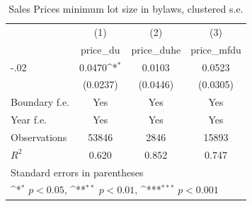 \begin{table}[htbp]\centering
\def\sym#1{\ifmmode^{#1}\else\(^{#1}\)\fi}
\caption{Sales Prices minimum lot size in bylaws, clustered s.e.}
\begin{tabular}{l*{3}{c}}
\hline\hline
                    &\multicolumn{1}{c}{(1)}&\multicolumn{1}{c}{(2)}&\multicolumn{1}{c}{(3)}\\
                    &\multicolumn{1}{c}{price\_du}&\multicolumn{1}{c}{price\_duhe}&\multicolumn{1}{c}{price\_mfdu}\\
\hline
-.02                &      0.0470\sym{*}  &      0.0103         &      0.0523         \\
                    &    (0.0237)         &    (0.0446)         &    (0.0305)         \\
[1em]
Boundary f.e.       &         Yes         &         Yes         &         Yes         \\
[1em]
Year f.e.           &         Yes         &         Yes         &         Yes         \\
\hline
Observations        &       53846         &        2846         &       15893         \\
\(R^{2}\)           &       0.620         &       0.852         &       0.747         \\
\hline\hline
\multicolumn{4}{l}{\footnotesize Standard errors in parentheses}\\
\multicolumn{4}{l}{\footnotesize \sym{*} \(p<0.05\), \sym{**} \(p<0.01\), \sym{***} \(p<0.001\)}\\
\end{tabular}
\end{table}
